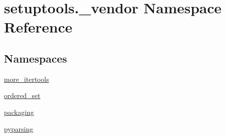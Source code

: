 \hypertarget{namespacesetuptools_1_1__vendor}{}\section{setuptools.\+\_\+vendor Namespace Reference}
\label{namespacesetuptools_1_1__vendor}
\subsection*{Namespaces}
\begin{DoxyCompactItemize}
\item 
 \hyperlink{namespacesetuptools_1_1__vendor_1_1more__itertools}{more\+\_\+itertools}
\item 
 \hyperlink{namespacesetuptools_1_1__vendor_1_1ordered__set}{ordered\+\_\+set}
\item 
 \hyperlink{namespacesetuptools_1_1__vendor_1_1packaging}{packaging}
\item 
 \hyperlink{namespacesetuptools_1_1__vendor_1_1pyparsing}{pyparsing}
\end{DoxyCompactItemize}
